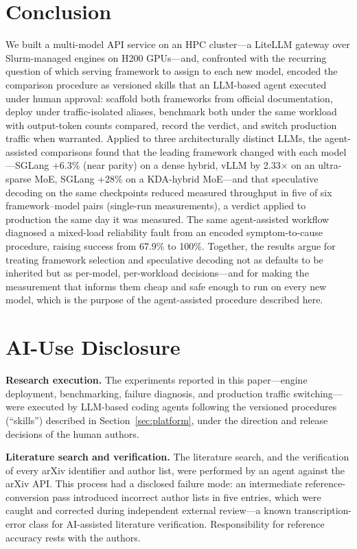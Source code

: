 \documentclass[11pt]{article}
\begin{document}
\section{Conclusion}

We built a multi-model API service on an HPC cluster---a LiteLLM gateway over Slurm-managed engines on H200 GPUs---and, confronted with the recurring question of which serving framework to assign to each new model, encoded the comparison procedure as versioned skills that an LLM-based agent executed under human approval: scaffold both frameworks from official documentation, deploy under traffic-isolated aliases, benchmark both under the same workload with output-token counts compared, record the verdict, and switch production traffic when warranted. Applied to three architecturally distinct LLMs, the agent-assisted comparisons found that the leading framework changed with each model---SGLang +6.3\% (near parity) on a dense hybrid, vLLM by 2.33$\times$ on an ultra-sparse MoE, SGLang +28\% on a KDA-hybrid MoE---and that speculative decoding on the same checkpoints reduced measured throughput in five of six framework--model pairs (single-run measurements), a verdict applied to production the same day it was measured. The same agent-assisted workflow diagnosed a mixed-load reliability fault from an encoded symptom-to-cause procedure, raising success from 67.9\% to 100\%. Together, the results argue for treating framework selection and speculative decoding not as defaults to be inherited but as per-model, per-workload decisions---and for making the measurement that informs them cheap and safe enough to run on every new model, which is the purpose of the agent-assisted procedure described here.

\section*{AI-Use Disclosure}

\textbf{Research execution.} The experiments reported in this paper---engine deployment, benchmarking, failure diagnosis, and production traffic switching---were executed by LLM-based coding agents following the versioned procedures (``skills'') described in Section~\ref{sec:platform}, under the direction and release decisions of the human authors.

\textbf{Literature search and verification.} The literature search, and the verification of every arXiv identifier and author list, were performed by an agent against the arXiv API. This process had a disclosed failure mode: an intermediate reference-conversion pass introduced incorrect author lists in five entries, which were caught and corrected during independent external review---a known transcription-error class for AI-assisted literature verification. Responsibility for reference accuracy rests with the authors.
\end{document}
